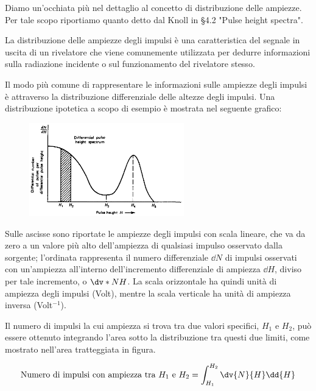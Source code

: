 \begin{approfondimento}
   \footnotesize
   Diamo un'occhiata più nel dettaglio al concetto di distribuzione delle ampiezze. Per tale scopo riportiamo quanto detto dal Knoll in \S4.2 "Pulse height spectra".

   \vspace{0.2cm}La distribuzione delle ampiezze degli impulsi è una caratteristica del segnale in uscita di un rivelatore che viene comunemente utilizzata per dedurre informazioni sulla radiazione incidente o sul funzionamento del rivelatore stesso.

   Il modo più comune di rappresentare le informazioni sulle ampiezze degli impulsi è attraverso la distribuzione differenziale delle altezze degli impulsi. Una distribuzione ipotetica a scopo di esempio è mostrata nel seguente grafico:
   \begin{figure}[H]
      \centering
      \includegraphics[width=0.6\textwidth]{immagini/distribuzione_differenziale_ampiezze.png}
   \end{figure}
   Sulle ascisse sono riportate le ampiezze degli impulsi con scala lineare, che va da zero a un valore più alto dell'ampiezza di qualsiasi impulso osservato dalla sorgente; l'ordinata rappresenta il numero differenziale $\dd{N}$ di impulsi osservati con un'ampiezza all'interno dell'incremento differenziale di ampiezza $\dd{H}$, diviso per tale incremento, o $\dv*{N}{H}$. La scala orizzontale ha quindi unità di ampiezza degli impulsi (Volt), mentre la scala verticale ha unità di ampiezza inversa (Volt$^{-1}$).
   
   Il numero di impulsi la cui ampiezza si trova tra due valori specifici, $H_1$ e $H_2$, può essere ottenuto integrando l'area sotto la distribuzione tra questi due limiti, come mostrato nell'area tratteggiata in figura.

   \begin{equation*}
      \text{Numero di impulsi con ampiezza tra $H_1$ e $H_2$}
      =\int_{H_1}^{H_2} \dv{N}{H} \dd{H}
   \end{equation*}
   

\end{approfondimento}
